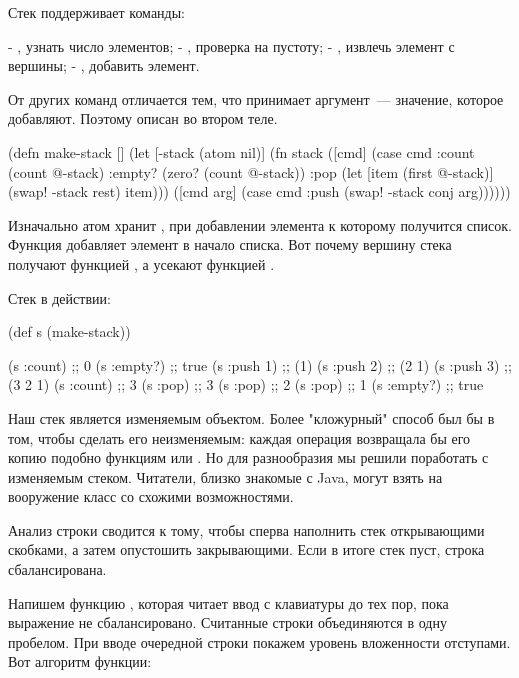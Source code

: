 Стек поддерживает команды:

- , узнать число элементов;
- , проверка на пустоту;
- , извлечь элемент с вершины;
- , добавить элемент.

От других команд  отличается тем, что принимает аргумент~--- значение, которое добавляют. Поэтому  описан во втором теле.

\begin{english}
  \begin{clojure}
(defn make-stack []
  (let [-stack (atom nil)]
    (fn stack
      ([cmd]
       (case cmd
         :count (count @-stack)
         :empty? (zero? (count @-stack))
         :pop (let [item (first @-stack)]
                (swap! -stack rest)
                item)))
      ([cmd arg]
       (case cmd
         :push
         (swap! -stack conj arg))))))
  \end{clojure}
\end{english}

Изначально атом хранит , при добавлении элемента к которому получится список. Функция  добавляет элемент в начало списка. Вот почему вершину стека получают функцией , а усекают функцией .

Стек в действии:

\begin{english}
  \begin{clojure}
(def s (make-stack))

(s :count)  ;; 0
(s :empty?) ;; true
(s :push 1) ;; (1)
(s :push 2) ;; (2 1)
(s :push 3) ;; (3 2 1)
(s :count)  ;; 3
(s :pop)    ;; 3
(s :pop)    ;; 2
(s :pop)    ;; 1
(s :empty?) ;; true
  \end{clojure}
\end{english}

Наш стек является изменяемым объектом. Более "кложурный" способ был бы в том, чтобы сделать его неизменяемым: каждая операция возвращала бы его копию подобно функциям  или . Но для разнообразия мы решили поработать с изменяемым стеком. Читатели, близко знакомые с Java, могут взять на вооружение класс  со схожими возможностями.

Анализ строки сводится к тому, чтобы сперва наполнить стек открывающими скобками, а затем опустошить закрывающими. Если в итоге стек пуст, строка сбалансирована.

Напишем функцию , которая читает ввод с клавиатуры до тех пор, пока выражение не сбалансировано. Считанные строки объединяются в одну пробелом. При вводе очередной строки покажем уровень вложенности отступами. Вот алгоритм функции:

